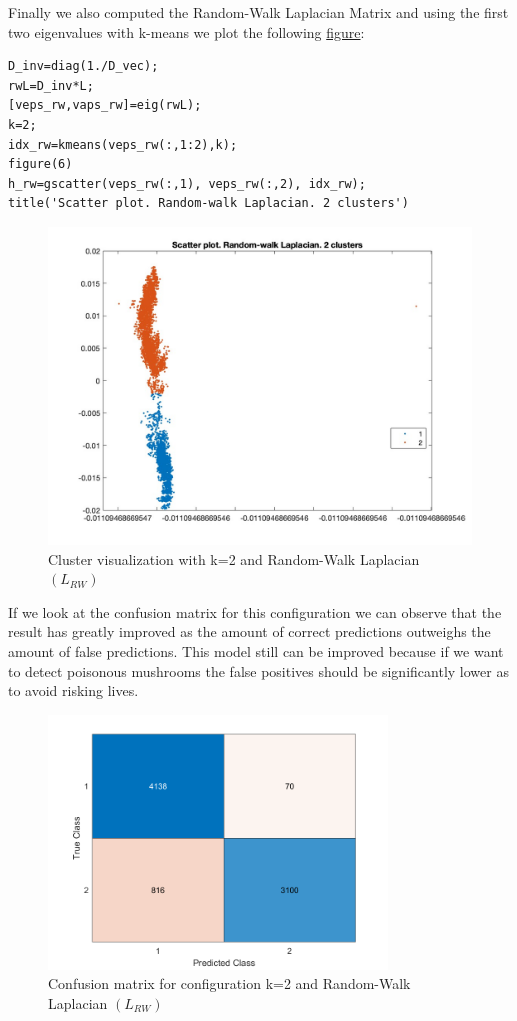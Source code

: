 \documentclass[12pt]{article}
\begin{document}
\smallskip
\justifying
Finally we also computed the Random-Walk Laplacian Matrix and using the first two eigenvalues with k-means we plot the following \href{fig:RWLapl2clusters}{figure}: 
\smallskip
\begin{lstlisting}
D_inv=diag(1./D_vec);
rwL=D_inv*L;
[veps_rw,vaps_rw]=eig(rwL);
k=2;
idx_rw=kmeans(veps_rw(:,1:2),k);
figure(6)
h_rw=gscatter(veps_rw(:,1), veps_rw(:,2), idx_rw);
title('Scatter plot. Random-walk Laplacian. 2 clusters')
\end{lstlisting}
\smallskip
\begin{figure}[H]
	\centering
	\includegraphics[width=12cm]{6.jpg}
	\caption{Cluster visualization with k=2 and Random-Walk Laplacian $(L_{RW})$}
	\label{fig:RWLapl2clusters}
\end{figure}
\smallskip
\justifying
If we look at the confusion matrix for this configuration we can observe that the result has greatly improved as the amount of correct predictions outweighs the amount of false predictions. This model still can be improved because if we want to detect poisonous mushrooms the false positives should be significantly lower as to avoid risking lives.

\begin{figure}[H]
	\centering
	\includegraphics[width=9cm]{confusionLrw.png}
	\caption{Confusion matrix for configuration k=2 and Random-Walk Laplacian $(L_{RW})$}
	\label{fig:confusionLrw}
\end{figure}
\end{document}
